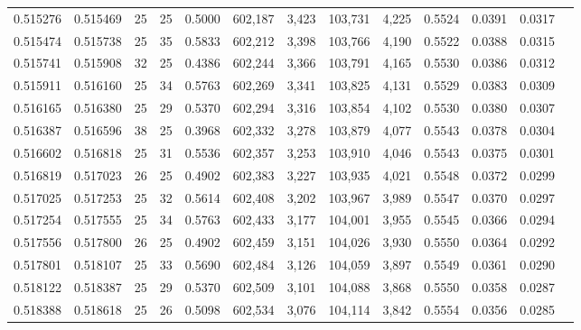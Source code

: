 \begin{tabular}{rrrrrrrrrrrrr}
0.515276 & 0.515469 &    25 &  25 &                                     0.5000 & 602,187 &   3,423 & 103,731 &   4,225 & 0.5524 & 0.0391 & 0.0317 \\
0.515474 & 0.515738 &    25 &  35 &                                     0.5833 & 602,212 &   3,398 & 103,766 &   4,190 & 0.5522 & 0.0388 & 0.0315 \\
0.515741 & 0.515908 &    32 &  25 &                                     0.4386 & 602,244 &   3,366 & 103,791 &   4,165 & 0.5530 & 0.0386 & 0.0312 \\
0.515911 & 0.516160 &    25 &  34 &                                     0.5763 & 602,269 &   3,341 & 103,825 &   4,131 & 0.5529 & 0.0383 & 0.0309 \\
0.516165 & 0.516380 &    25 &  29 &                                     0.5370 & 602,294 &   3,316 & 103,854 &   4,102 & 0.5530 & 0.0380 & 0.0307 \\
0.516387 & 0.516596 &    38 &  25 &                                     0.3968 & 602,332 &   3,278 & 103,879 &   4,077 & 0.5543 & 0.0378 & 0.0304 \\
0.516602 & 0.516818 &    25 &  31 &                                     0.5536 & 602,357 &   3,253 & 103,910 &   4,046 & 0.5543 & 0.0375 & 0.0301 \\
0.516819 & 0.517023 &    26 &  25 &                                     0.4902 & 602,383 &   3,227 & 103,935 &   4,021 & 0.5548 & 0.0372 & 0.0299 \\
0.517025 & 0.517253 &    25 &  32 &                                     0.5614 & 602,408 &   3,202 & 103,967 &   3,989 & 0.5547 & 0.0370 & 0.0297 \\
0.517254 & 0.517555 &    25 &  34 &                                     0.5763 & 602,433 &   3,177 & 104,001 &   3,955 & 0.5545 & 0.0366 & 0.0294 \\
0.517556 & 0.517800 &    26 &  25 &                                     0.4902 & 602,459 &   3,151 & 104,026 &   3,930 & 0.5550 & 0.0364 & 0.0292 \\
0.517801 & 0.518107 &    25 &  33 &                                     0.5690 & 602,484 &   3,126 & 104,059 &   3,897 & 0.5549 & 0.0361 & 0.0290 \\
0.518122 & 0.518387 &    25 &  29 &                                     0.5370 & 602,509 &   3,101 & 104,088 &   3,868 & 0.5550 & 0.0358 & 0.0287 \\
0.518388 & 0.518618 &    25 &  26 &                                     0.5098 & 602,534 &   3,076 & 104,114 &   3,842 & 0.5554 & 0.0356 & 0.0285 \\

\end{tabular}
